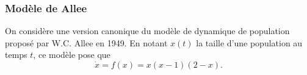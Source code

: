\subsubsection{Modèle de Allee \todo{}}


On considère une version canonique du modèle de dynamique de population proposé par W.C. Allee en 1949. En notant $x(t)$ la taille d'une population au temps $t$, ce modèle pose que 
\begin{equation} \label{eq:modAllee}
  \dot x = f(x) = x (x-1) (2-x).
\end{equation}

\bigskip 
